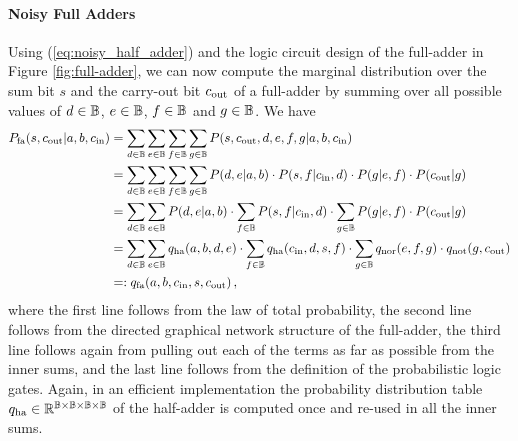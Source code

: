 \paragraph{Noisy Full Adders} Using (\ref{eq:noisy_half_adder}) and the logic circuit design of the full-adder in Figure \ref{fig:full-adder}, we can now compute the marginal distribution over the sum bit $s$ and the carry-out bit $c_{\mathrm{out}}$ of a full-adder by summing over all possible values of $d \in \mathbb{B}$, $e \in \mathbb{B}$, $f \in \mathbb{B}$ and $g \in \mathbb{B}$. We have
\begin{align}
    P_{\mathrm{fa}}(s,c_{\mathrm{out}}|a,b,c_{\mathrm{in}}) & = \sum_{d\in\mathbb{B}} \sum_{e\in\mathbb{B}} \sum_{f\in\mathbb{B}} \sum_{g\in\mathbb{B}} P(s,c_{\mathrm{out}},d,e,f,g|a,b,c_{\mathrm{in}}) \nonumber                                                      \\
                            & = \sum_{d\in\mathbb{B}} \sum_{e\in\mathbb{B}} \sum_{f\in\mathbb{B}} \sum_{g\in\mathbb{B}}
    P(d,e|a,b) \cdot P(s,f|c_{\mathrm{in}},d) \cdot P(g|e,f) \cdot P(c_{\mathrm{out}}|g) \nonumber                                                                                                                                       \\
                            & = \sum_{d\in\mathbb{B}} \sum_{e\in\mathbb{B}} P(d,e|a,b) \cdot \sum_{f\in\mathbb{B}} P(s,f|c_{\mathrm{in}},d) \cdot \sum_{g\in\mathbb{B}} P(g|e,f) \cdot P(c_{\mathrm{out}}|g) \nonumber                   \\
                            & = \sum_{d\in\mathbb{B}} \sum_{e\in\mathbb{B}} q_{\mathrm{ha}}(a,b,d,e) \cdot \sum_{f\in\mathbb{B}} q_{\mathrm{ha}}(c_{\mathrm{in}},d,s,f) \cdot \sum_{g\in\mathbb{B}} q_{\mathrm{nor}}(e,f,g) \cdot q_{\mathrm{not}}(g,c_{\mathrm{out}}) \nonumber \\
                            & =: q_{\mathrm{fa}}(a,b,c_{\mathrm{in}},s,c_{\mathrm{out}}) \label{eq:noisy_full_adder} \,,
\end{align}
where the first line follows from the law of total probability, the second line follows from the directed graphical network structure of the full-adder, the third line follows again from pulling out each of the terms as far as possible from the inner sums, and the last line follows from the definition of the probabilistic logic gates. Again, in an efficient implementation the probability distribution table $q_{\mathrm{ha}} \in \mathbb{R}^{\mathbb{B}\times\mathbb{B}\times\mathbb{B}\times\mathbb{B}}$ of the half-adder is computed once and re-used in all the inner sums.

